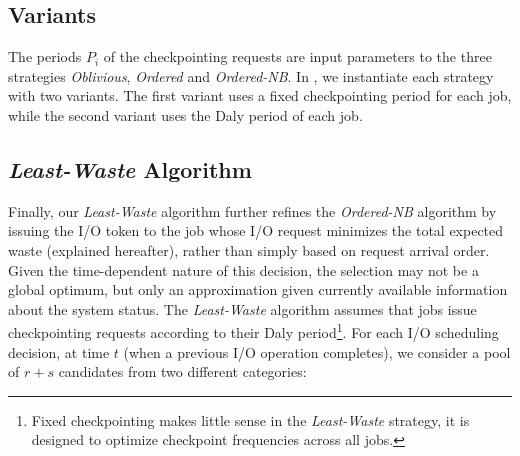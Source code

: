 \documentclass[two]{article}
\newcommand{\eg}[0]{\emph{e.g.}\xspace}
\newcommand{\period}[1]{P_{#1}}
\newcommand{\nocoop}{\emph{Oblivious}\xspace}
\newcommand{\fifoblock}{\emph{Ordered}\xspace}
\newcommand{\fifononblock}{\emph{Ordered-NB}\xspace}
\newcommand{\leastwaste}{\emph{Least-Waste}\xspace}
\begin{document}

\subsection{Variants}
\label{sec:variants}

The periods $\period{i}$ of the checkpointing requests are input parameters to
the three strategies \nocoop, \fifoblock and \fifononblock. In
, we instantiate each strategy with two variants. The first
variant uses a fixed checkpointing period for each job, while the second
variant uses the Daly period of each job.
 
\subsection{\leastwaste Algorithm}
\label{sec:least-waste}

Finally, our \leastwaste algorithm further refines the \fifononblock algorithm
by issuing the I/O token to the job whose I/O request minimizes the total
expected waste (explained hereafter), rather than simply based on request
arrival order.  Given the time-dependent nature of this decision, the selection
may not be a global optimum, but only an approximation given currently
available information about the system status. The \leastwaste algorithm
assumes that jobs issue checkpointing requests according to their Daly
period\footnote{Fixed checkpointing makes little sense in the \leastwaste strategy,
it is designed to optimize checkpoint frequencies across all jobs.}.  For each
I/O scheduling decision, at time $t$ (when a previous I/O operation completes),
we consider a pool of $r+s$ candidates from two different categories:
\end{document}
